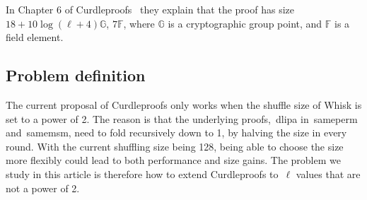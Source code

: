 In Chapter 6 of Curdleproofs~\cite{Curdleproofs} they explain that the proof has size~$18+10 \log(\ell+4)\mathbb{G}$, $7\mathbb{F}$, where $\mathbb{G}$ is a cryptographic group point, and $\mathbb{F}$ is a field element.

\subsection{Problem definition}\label{subsec:problem-definition}
The current proposal of Curdleproofs only works when the shuffle size of Whisk is set to a power of 2.
The reason is that the underlying proofs,~\gls{dlipa} in~\gls{sameperm} and~\gls{samemsm}, need to fold recursively down to 1, by halving the size in every round.
With the current shuffling size being 128, being able to choose the size more flexibly could lead to both performance and size gains.
The problem we study in this article is therefore how to extend Curdleproofs to~$\ell$ values that are not a power of 2.

